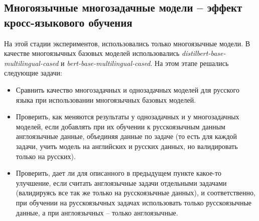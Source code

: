 \subsection{Многоязычные многозадачные модели -- эффект кросс-языкового обучения}

На этой стадии экспериментов, использовались только многоязычные модели. В качестве многоязычных базовых моделей использовались \textit{distilbert-base-multilingual-cased} и \textit{bert-base-multilingual-cased}. На этом этапе решались следующие задачи:

 \begin{itemize}
\item Сравнить качество многозадачных и однозадачных моделей для русского языка при использовании многоязычных базовых моделей. 
\item Проверить, как меняются результаты у однозадачных и у многозадачных моделей, если добавлять при их обучении к русскоязычным данным англоязычные данные, объединяя данные по задаче (то есть для каждой задачи, учить модель на английских и русских данных, но валидировать только на русских).
\item Проверить, дает ли для описанного в предыдущем пункте какое-то улучшение, если считать англоязычные задачи отдельными задачами (валидируясь все так же только на русскоязычные данных), и соответственно, при обучении на русскоязычных задачах использовать только русскоязычные данные, а при англоязычных -- только англоязычные. 
\end{itemize} 

